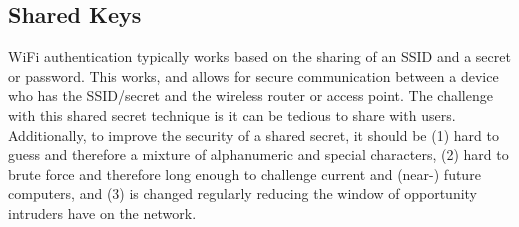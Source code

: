 \subsection{Shared Keys}
WiFi authentication typically works based on the sharing of an SSID and a secret or password.
This works, and allows for secure communication between a device who has the SSID/secret and
the wireless router or access point. The challenge with this shared secret technique is it
can be tedious to share with users. Additionally, to improve the security of a shared secret,
it should be (1) hard to guess and therefore a mixture of alphanumeric and special characters,
(2) hard to brute force and therefore long enough to challenge current and (near-) future computers,
and (3) is changed regularly reducing the window of opportunity intruders have on the network.
